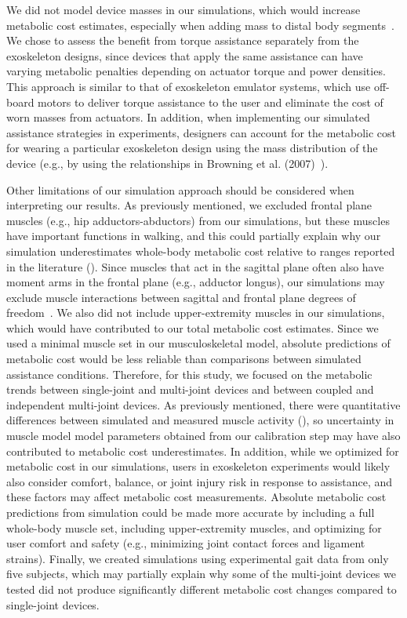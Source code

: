 \documentclass[10pt,letterpaper]{article}
\begin{document}
We did not model device masses in our simulations, which would increase metabolic cost estimates, especially when adding mass to distal body segments~\cite{Browning:2007}. We chose to assess the benefit from torque assistance separately from the exoskeleton designs, since devices that apply the same assistance can have varying metabolic penalties depending on actuator torque and power densities. This approach is similar to that of exoskeleton emulator systems, which use off-board motors to deliver torque assistance to the user and eliminate the cost of worn masses from actuators. In addition, when implementing our simulated assistance strategies in experiments, designers can account for the metabolic cost for wearing a particular exoskeleton design using the mass distribution of the device (e.g., by using the relationships in Browning et al. (2007)~\cite{Browning:2007}).

Other limitations of our simulation approach should be considered when interpreting our results. As previously mentioned, we excluded frontal plane muscles (e.g., hip adductors-abductors) from our simulations, but these muscles have important functions in walking, and this could partially explain why our simulation underestimates whole-body metabolic cost relative to ranges reported in the literature (). Since muscles that act in the sagittal plane often also have moment arms in the frontal plane (e.g., adductor longus), our simulations may exclude muscle interactions between sagittal and frontal plane degrees of freedom~\cite{Dembia:2017}. We also did not include upper-extremity muscles in our simulations, which would have contributed to our total metabolic cost estimates. Since we used a minimal muscle set in our musculoskeletal model, absolute predictions of metabolic cost would be less reliable than comparisons between simulated assistance conditions. Therefore, for this study, we focused on the metabolic trends between single-joint and multi-joint devices and between coupled and independent multi-joint devices. As previously mentioned, there were quantitative differences between simulated and measured muscle activity (), so uncertainty in muscle model model parameters obtained from our calibration step may have also contributed to metabolic cost underestimates. In addition, while we optimized for metabolic cost in our simulations, users in exoskeleton experiments would likely also consider comfort, balance, or joint injury risk in response to assistance, and these factors may affect metabolic cost measurements. Absolute metabolic cost predictions from simulation could be made more accurate by including a full whole-body muscle set, including upper-extremity muscles, and optimizing for user comfort and safety (e.g., minimizing joint contact forces and ligament strains). Finally, we created simulations using experimental gait data from only five subjects, which may partially explain why some of the multi-joint devices we tested did not produce significantly different metabolic cost changes compared to single-joint devices. 
\end{document}
